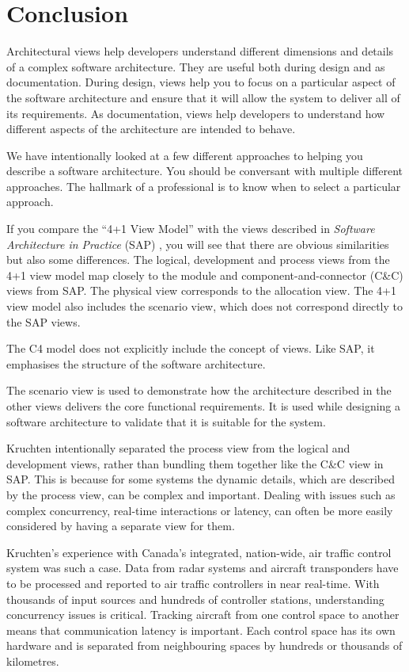 


\section{Conclusion}
Architectural views help developers understand different dimensions and details of a complex software architecture.
They are useful both during design and as documentation.
During design, views help you to focus on a particular aspect of the software architecture and ensure that it will allow the system to deliver all of its requirements.
As documentation, views help developers to understand how different aspects of the architecture are intended to behave.

We have intentionally looked at a few different approaches to helping you describe a software architecture.
You should be conversant with multiple different approaches.
The hallmark of a professional is to know when to select a particular approach.

If you compare the ``4+1 View Model'' \cite{4+1-model} with the views described in \textit{Software Architecture in Practice} (SAP) \cite{bass2021software},
you will see that there are obvious similarities but also some differences.
The logical, development and process views from the 4+1 view model map closely to the module and component-and-connector (C\&C) views from SAP.
The physical view corresponds to the allocation view.
The 4+1 view model also includes the scenario view, which does not correspond directly to the SAP views.

The C4 model does not explicitly include the concept of views.
Like SAP, it emphasises the structure of the software architecture.

\noindent
The scenario view is used to demonstrate how the architecture described in the other views delivers the core functional requirements.
It is used while designing a software architecture to validate that it is suitable for the system.

Kruchten intentionally separated the process view from the logical and development views,
rather than bundling them together like the C\&C view in SAP.
This is because for some systems the dynamic details, which are described by the process view, can be complex and important.
Dealing with issues such as complex concurrency, real-time interactions or latency, can often be more easily considered by having a separate view for them.

Kruchten's experience with Canada's integrated, nation-wide, air traffic control system was such a case.
Data from radar systems and aircraft transponders have to be processed and reported to air traffic controllers in near real-time.
With thousands of input sources and hundreds of controller stations, understanding concurrency issues is critical.
Tracking aircraft from one control space to another means that communication latency is important.
Each control space has its own hardware and is separated from neighbouring spaces by hundreds or thousands of kilometres.

